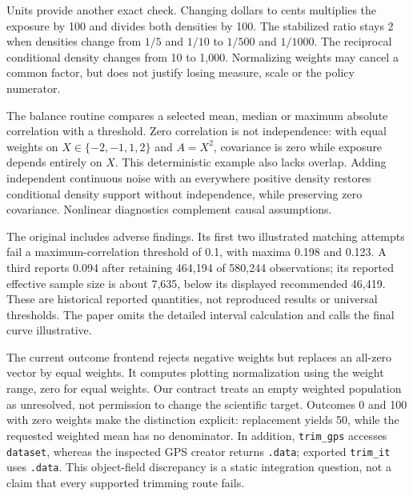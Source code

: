 Units provide another exact check. Changing dollars to cents multiplies the
exposure by 100 and divides both densities by 100. The stabilized ratio stays
2 when densities change from $1/5$ and $1/10$ to $1/500$ and $1/1000$.
The reciprocal conditional density changes from 10 to 1,000. Normalizing weights
may cancel a common factor, but does not justify losing measure, scale or the
policy numerator.\citep{exec24_dose_contract}

The balance routine compares a selected mean, median or maximum absolute
correlation with a threshold. Zero correlation is not independence: with equal
weights on $X\in\{-2,-1,1,2\}$ and $A=X^2$, covariance is zero while exposure
depends entirely on $X$. This deterministic example also lacks overlap.
Adding independent continuous noise with an everywhere positive density
restores conditional density support without independence, while preserving
zero covariance. Nonlinear diagnostics complement causal assumptions.
\citep{exec24_dose_causalgps,exec24_dose_contract}

The original includes adverse findings. Its first two illustrated matching
attempts fail a maximum-correlation threshold of 0.1, with maxima 0.198 and
0.123. A third reports 0.094 after retaining 464,194 of 580,244 observations;
its reported effective sample size is about 7,635, below its displayed
recommended 46,419. These are historical reported quantities, not reproduced
results or universal thresholds. The paper omits the detailed interval
calculation and calls the final curve illustrative.
\citep{exec24_dose_original}

The current outcome frontend rejects negative weights but replaces an all-zero
vector by equal weights. It computes plotting normalization using the weight
range, zero for equal weights. Our contract treats an empty weighted population
as unresolved, not permission to change the scientific target. Outcomes 0 and
100 with zero weights make the distinction explicit: replacement yields 50,
while the requested weighted mean has no denominator. In addition,
\texttt{trim\_gps} accesses \texttt{dataset}, whereas the inspected GPS creator
returns \texttt{.data}; exported \texttt{trim\_it} uses \texttt{.data}.
This object-field discrepancy is a static integration question, not a claim
that every supported trimming route fails.
\citep{exec24_dose_causalgps,exec24_dose_contract}

